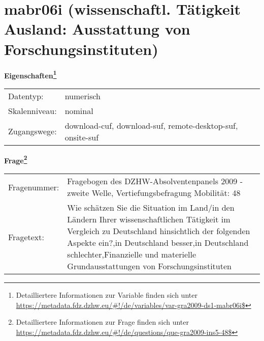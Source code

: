 
    \setcounter{footnote}{0}

    \vspace*{-1.8cm}
	\section{mabr06i (wissenschaftl. Tätigkeit Ausland: Ausstattung von Forschungsinstituten)}
	\label{section:mabr06i}



    \vspace*{0.5cm}
    \noindent\textbf{Eigenschaften\footnote{Detailliertere Informationen zur Variable finden sich unter
		\url{https://metadata.fdz.dzhw.eu/\#!/de/variables/var-gra2009-ds1-mabr06i$}}}\\
	\begin{tabularx}{\hsize}{@{}lX}
	Datentyp: & numerisch \\
	Skalenniveau: & nominal \\
	Zugangswege: &
	  download-cuf, 
	  download-suf, 
	  remote-desktop-suf, 
	  onsite-suf
 \\
    \end{tabularx}



				\vspace*{0.5cm}
                \noindent\textbf{Frage\footnote{Detailliertere Informationen zur Frage finden sich unter
		              \url{https://metadata.fdz.dzhw.eu/\#!/de/questions/que-gra2009-ins5-48$}}}\\
				\begin{tabularx}{\hsize}{@{}lX}
					Fragenummer: &
					  Fragebogen des DZHW-Absolventenpanels 2009 - zweite Welle, Vertiefungsbefragung Mobilität:
					  48
 \\
					Fragetext: & Wie schätzen Sie die Situation im Land/in den Ländern Ihrer wissenschaftlichen Tätigkeit im Vergleich zu Deutschland hinsichtlich der folgenden Aspekte ein?,in Deutschland besser,in Deutschland schlechter,Finanzielle und materielle Grundausstattungen von Forschungsinstituten \\
				\end{tabularx}





